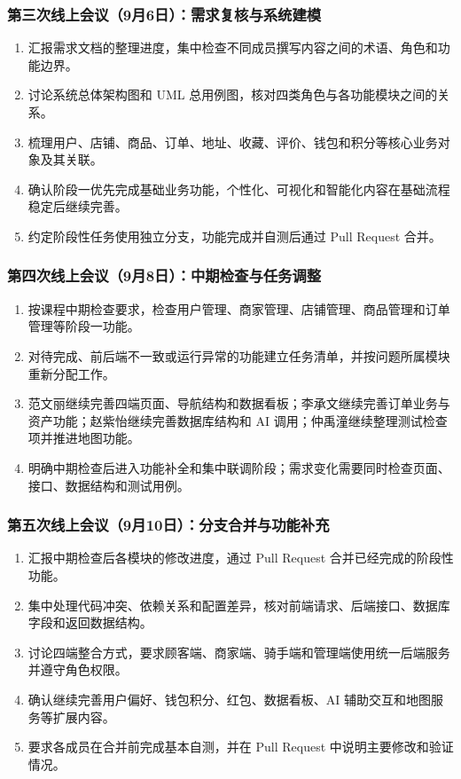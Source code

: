 \subsubsection{第三次线上会议（9月6日）：需求复核与系统建模}
\begin{enumerate}
  \item 汇报需求文档的整理进度，集中检查不同成员撰写内容之间的术语、角色和功能边界。
  \item 讨论系统总体架构图和 UML 总用例图，核对四类角色与各功能模块之间的关系。
  \item 梳理用户、店铺、商品、订单、地址、收藏、评价、钱包和积分等核心业务对象及其关联。
  \item 确认阶段一优先完成基础业务功能，个性化、可视化和智能化内容在基础流程稳定后继续完善。
  \item 约定阶段性任务使用独立分支，功能完成并自测后通过 Pull Request 合并。
\end{enumerate}

\subsubsection{第四次线上会议（9月8日）：中期检查与任务调整}
\begin{enumerate}
  \item 按课程中期检查要求，检查用户管理、商家管理、店铺管理、商品管理和订单管理等阶段一功能。
  \item 对待完成、前后端不一致或运行异常的功能建立任务清单，并按问题所属模块重新分配工作。
  \item 范文丽继续完善四端页面、导航结构和数据看板；李承文继续完善订单业务与资产功能；赵紫怡继续完善数据库结构和 AI 调用；仲禹潼继续整理测试检查项并推进地图功能。
  \item 明确中期检查后进入功能补全和集中联调阶段；需求变化需要同时检查页面、接口、数据结构和测试用例。
\end{enumerate}

\subsubsection{第五次线上会议（9月10日）：分支合并与功能补充}
\begin{enumerate}
  \item 汇报中期检查后各模块的修改进度，通过 Pull Request 合并已经完成的阶段性功能。
  \item 集中处理代码冲突、依赖关系和配置差异，核对前端请求、后端接口、数据库字段和返回数据结构。
  \item 讨论四端整合方式，要求顾客端、商家端、骑手端和管理端使用统一后端服务并遵守角色权限。
  \item 确认继续完善用户偏好、钱包积分、红包、数据看板、AI 辅助交互和地图服务等扩展内容。
  \item 要求各成员在合并前完成基本自测，并在 Pull Request 中说明主要修改和验证情况。
\end{enumerate}

